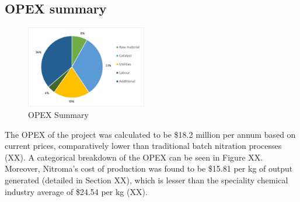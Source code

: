 \subsection{OPEX summary}

\begin{figure}
    \vspace{-1.1cm}
    \caption{OPEX Summary}
    \label{fig:OPEXSummary}
    \includegraphics[width=0.47\textwidth]{chapters/6-economics/figures/OPEX_summary.jpg}
\end{figure}
The OPEX of the project was calculated to be \$18.2 million per annum based on current prices, comparatively lower than traditional batch nitration processes (XX). A categorical breakdown of the OPEX can be seen in Figure XX. Moreover, Nitroma's cost of production was found to be \$15.81 per kg of output generated (detailed in Section XX), which is lesser than the speciality chemical industry average of \$24.54 per kg (XX).

